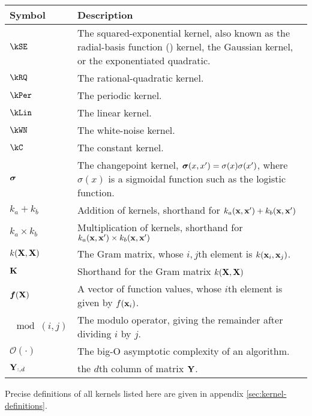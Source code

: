 \begin{tabular}{lm{12cm}}
Symbol \quad     & Description \\
\hline
$\kSE$ & The squared-exponential kernel, also known as the radial-basis function (\RBF{}) kernel, the Gaussian kernel, or the exponentiated quadratic. \\
$\kRQ$ & The rational-quadratic kernel. \\
$\kPer$ & The periodic kernel. \\
$\kLin$ & The linear kernel. \\
$\kWN$ & The white-noise kernel. \\
$\kC$ & The constant kernel. \\
${\boldsymbol{\sigma}}$ & The changepoint kernel, ${\boldsymbol{\sigma}}(x, x') = \sigma(x) \sigma(x')$, where $\sigma(x)$ is a sigmoidal function such as the logistic function. \\
$k_a + k_b$ & Addition of kernels, shorthand for $k_a({\bf{x}}, {\bf{x}}') + k_b({\bf{x}}, {\bf{x}}')$ \\
$k_a \times k_b$& Multiplication of kernels, shorthand for $k_a({\bf{x}}, {\bf{x}}') \times k_b({\bf{x}}, {\bf{x}}')$ \\
$k(\mathbf{X}, \mathbf{X})$ & The Gram matrix, whose $i,j$th element is $k({\bf{x}}_i, {\bf{x}}_j)$. \\
$\mathbf{K}$ & Shorthand for the Gram matrix $k(\mathbf{X}, \mathbf{X})$ \\
$\boldsymbol{f}(\mathbf{X})$ & A vector of function values, whose $i$th element is given by $f({\bf{x}}_i)$. \\
$\mod(i,j)$ & The modulo operator, giving the remainder after dividing $i$ by $j$. \\
$\mathcal{O}(\cdot)$ & The big-O asymptotic complexity of an algorithm. \\
$\mathbf{Y}_{:,d}$ & the $d$th column of matrix $\mathbf{Y}$.
\end{tabular}

\vspace{1cm}
Precise definitions of all kernels listed here are given in appendix \ref{sec:kernel-definitions}.


\outbpdocument{
}


